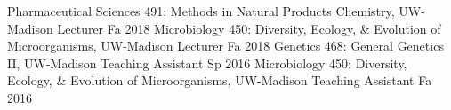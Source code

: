 

\begin{cvhonors}
  \cvhonor
    {Pharmaceutical Sciences 491: Methods in Natural Products Chemistry, UW-Madison}
    {Lecturer}
    {Fa 2018}
  \cvhonor
    {Microbiology 450: Diversity, Ecology, \& Evolution of Microorganisms, UW-Madison}
    {Lecturer}
    {Fa 2018}
  \cvhonor
    {Genetics 468: General Genetics II, UW-Madison}
    {Teaching Assistant}
    {Sp 2016}
  \cvhonor
    {Microbiology 450: Diversity, Ecology, \& Evolution of Microorganisms, UW-Madison}
    {Teaching Assistant}
    {Fa 2016}
\end{cvhonors}